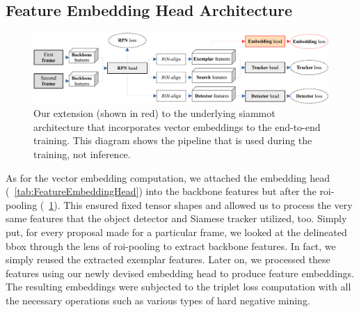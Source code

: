 \subsection{Feature Embedding Head Architecture}

\begin{figure}[!t]
    \centering
    \includegraphics[width=\linewidth]{figures/siamese_tracking/siammot_feature_emb_training.pdf}
    \caption[Embedding-enhanced \gls{siammot} architecture]{Our extension (shown in red) to the underlying \gls{siammot} architecture that incorporates vector embeddings to the end-to-end training. This diagram shows the pipeline that is used during the training, not inference.}
    \label{fig:SiamMOTWithEmbeddings}
\end{figure}

As for the vector embedding computation, we attached the embedding head (\tabletext{}~\ref{tab:FeatureEmbeddingHead}) into the backbone features but after the \gls{roi}-pooling (\figtext{}~\ref{fig:SiamMOTWithEmbeddings}). This ensured fixed tensor shapes and allowed us to process the very same features that the object detector and Siamese tracker utilized, too. Simply put, for every proposal made for a particular frame, we looked at the delineated \gls{bbox} through the lens of \gls{roi}-pooling to extract backbone features. In fact, we simply reused the extracted exemplar features. Later on, we processed these features using our newly devised embedding head to produce feature embeddings. The resulting embeddings were subjected to the triplet loss computation with all the necessary operations such as various types of hard negative mining.

